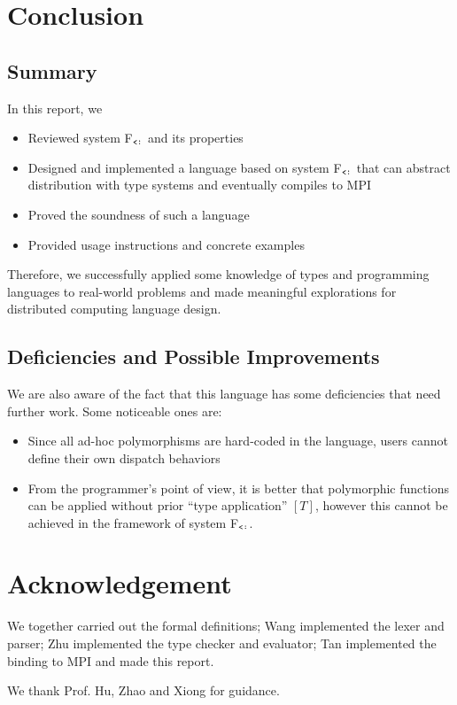 \documentclass{report}
\newcommand{\subty}{\texttt{{\raisebox{-.7pt}{<}:}}}
\begin{document}
\chapter{Conclusion}

\section{Summary}

In this report, we

\begin{itemize}
    \item Reviewed system F$_\subty$ and its properties
    \item Designed and implemented a language based on system F$_\subty$ that can abstract distribution with type systems and eventually compiles to MPI
    \item Proved the soundness of such a language
    \item Provided usage instructions and concrete examples
\end{itemize}

Therefore, we successfully applied some knowledge of types and programming languages to real-world problems and made meaningful explorations for distributed computing language design.

\section{Deficiencies and Possible Improvements}

We are also aware of the fact that this language has some deficiencies that need further work. Some noticeable ones are:

\begin{itemize}
    \item Since all ad-hoc polymorphisms are hard-coded in the language, users cannot define their own dispatch behaviors
    \item From the programmer's point of view, it is better that polymorphic functions can be applied without prior ``type application'' $[T]$, however this cannot be achieved in the framework of system F$_\subty$.
\end{itemize}

\chapter*{Acknowledgement}

We together carried out the formal definitions; Wang implemented the lexer and parser; Zhu implemented the type checker and evaluator; Tan implemented the binding to MPI and made this report.

We thank Prof. Hu, Zhao and Xiong for guidance.


\end{document}
